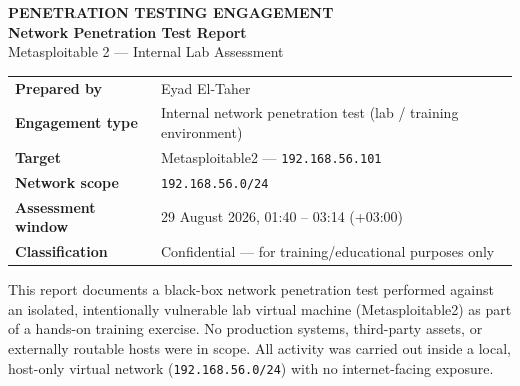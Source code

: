 \documentclass[11pt,a4paper]{article}
\begin{document}
\begin{titlepage}
\noindent
{}

\begin{minipage}[t][6.8cm][c]{\paperwidth}
\hspace{2.4cm}
\begin{minipage}{0.88\paperwidth}
\raggedright{}
\color{white}
{\small\bfseries\sffamily\color{teal!60!white} PENETRATION TESTING ENGAGEMENT}\\[0.4em]
{\fontsize{29}{34}\selectfont\bfseries\sffamily Network Penetration Test Report}\\[0.3em]
{\Large\sffamily Metasploitable 2 --- Internal Lab Assessment}
\end{minipage}
\end{minipage}

\vspace{2.4cm}

\hspace{2.4cm}
\begin{minipage}{0.8\paperwidth}
\renewcommand{\arraystretch}{1.6}
\begin{tabular}{L{4.2cm} L{9.5cm}}
\textbf{\color{navy}Prepared by} & Eyad El-Taher \\
\textbf{\color{navy}Engagement type} & Internal network penetration test (lab / training environment) \\
\textbf{\color{navy}Target} & Metasploitable2 --- \texttt{192.168.56.101} \\
\textbf{\color{navy}Network scope} & \texttt{192.168.56.0/24} \\
\textbf{\color{navy}Assessment window} & 29 August 2026, 01:40 -- 03:14 (+03:00) \\
\textbf{\color{navy}Classification} & Confidential --- for training/educational purposes only \\
\end{tabular}
\end{minipage}

\vfill

\hspace{2.4cm}
\begin{minipage}{0.8\paperwidth}
\begin{panel}
\small
This report documents a black-box network penetration test performed against an isolated, intentionally vulnerable lab virtual machine (Metasploitable2) as part of a hands-on training exercise. No production systems, third-party assets, or externally routable hosts were in scope. All activity was carried out inside a local, host-only virtual network (\texttt{192.168.56.0/24}) with no internet-facing exposure.
\end{panel}
\end{minipage}

\restoregeometry
\end{titlepage}
\end{document}
